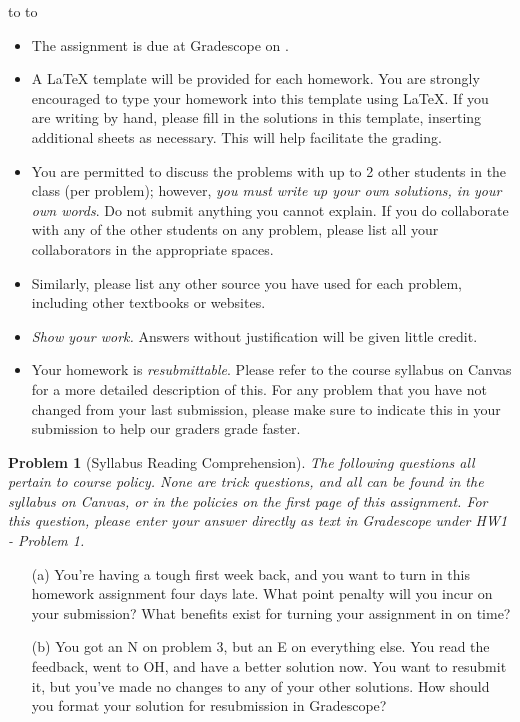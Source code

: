 \documentclass[10pt]{article}
\newcommand{\handout}{
   \renewcommand{\thepage}{H\hnumber-\arabic{page}}
   \noindent
   \begin{center}
      \vbox{
    \hbox to \columnwidth {\sc{\course} --- \prof \hfill}
    \vspace{-2mm}
    \hbox to \columnwidth {\sc due \MakeLowercase{\duedate} \duelocation\hfill {\Huge\color{mdb}H\hnumber.\yourname}}
      }
   \end{center}
   \vspace*{2mm}
}
\newtheorem{problem}{\sc\color{cit}Problem}
\begin{document}
\handout
\begin{itemize}
\item The assignment is due at Gradescope on \duedate.

\item A LaTeX template will be provided for each homework. You are strongly encouraged to type your homework into this template using \LaTeX.  If you are writing by hand, please fill in the solutions in this template, inserting additional sheets as necessary. This will help facilitate the grading.

\item You are permitted to discuss the problems with up to 2 other students in the class (per problem); however, {\em you must write up your own solutions, in your own words}. Do not submit anything you cannot explain. If you do collaborate with any of the other students on any problem, please list all your collaborators in the appropriate spaces.

\item Similarly, please list any other source you have used for each problem, including other textbooks or websites.

\item {\em Show your work.} Answers without justification will be given little credit.

\item Your homework is \textit{resubmittable}. Please refer to the course syllabus on Canvas for a more detailed description of this. For any problem that you have not changed from your last submission, please make sure to indicate this in your submission to help our graders grade faster. 

\end{itemize}
\newpage



\begin{problem}[Syllabus Reading Comprehension] The following questions all pertain to course policy. None are trick questions, and all can be found in the syllabus on Canvas, or in the policies on the first page of this assignment. For this question, please enter your answer directly  as text in Gradescope under HW1 - Problem 1.
\end{problem}

\begin{enumerate}
    \item[(a)] You're having a tough first week back, and you want to turn in this homework assignment four days late. What point penalty will you incur on your submission? What benefits exist for turning your assignment in on time?
    \item[(b)] You got an N on problem 3, but an E on everything else. You read the feedback, went to OH, and have a better solution now. You want to resubmit it, but you've made no changes to any of your other solutions. How should you format your solution for resubmission in Gradescope?
\end{enumerate}
\end{document}
